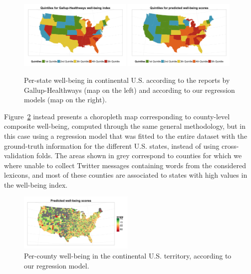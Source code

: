 \documentclass{acm_proc_article-sp}
\begin{document}
\begin{figure}[t!]
\centering
\includegraphics[width=0.48\textwidth]{quintiles_state_gallup_2}
\includegraphics[width=0.48\textwidth]{quintiles_state_model}
\caption{Per-state well-being in continental U.S. according to the reports by Gallup-Healthways (map on the left) and according to our regression models (map on the right).}
\label{f3}
\end{figure}

Figure~\ref{f4} instead presents a choropleth map corresponding to county-level composite well-being, computed through the same general methodology, but in this case using a regression model that was fitted to the entire dataset with the ground-truth information for the different U.S. states, instead of using cross-validation folds. The areas shown in grey correspond to counties for which we where unable to collect Twitter messages containing words from the considered lexicons, and most of these counties are associated to states with high values in the well-being index.

\begin{figure}[b!]
\centering
\includegraphics[width=0.49\textwidth]{scores_by_county_model}
\caption{Per-county well-being in the continental U.S. territory, according to our regression model.}
\label{f4}
\end{figure}
\end{document}

